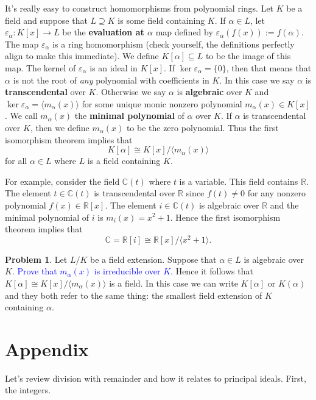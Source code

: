 \documentclass[11pt]{article}
\def\RR{\mathbb{R}}
\def\CC{\mathbb{C}}
\def\ve{\varepsilon}
\theoremstyle{definition}
\newtheorem{problem}{Problem}[section]
\numberwithin{equation}{subsection}
\newcommand{\blue}[1]{\textcolor{blue}{#1}}
\begin{document}
It's really easy to construct homomorphisms from polynomial rings.
Let $K$ be a field and suppose that $L \supseteq K$ is some field containing $K$.
If $\alpha \in L$, let $\ve_\alpha : K[x] \to L$ be the \textbf{evaluation at $\alpha$} map defined by $\ve_\alpha(f(x)) := f(\alpha)$.
The map $\ve_\alpha$ is a ring homomorphism (check yourself, the definitions perfectly align to make this immediate).
We define $K[\alpha] \subseteq L$ to be the image of this map.
The kernel of $\ve_\alpha$ is an ideal in $K[x]$.
If $\ker \ve_\alpha = \{0\}$, then that means that $\alpha$ is not the root of \emph{any} polynomial with coefficients in $K$.
In this case we say $\alpha$ is \textbf{transcendental} over $K$.
Otherwise we say $\alpha$ is \textbf{algebraic} over $K$ and $\ker \ve_\alpha = \langle m_\alpha(x)\rangle$ for some unique monic nonzero polynomial $m_\alpha(x) \in K[x]$.
We call $m_\alpha(x)$ the \textbf{minimal polynomial} of $\alpha$ over $K$.
If $\alpha$ is transcendental over $K$, then we define $m_\alpha(x)$ to be the zero polynomial.
Thus the first isomorphism theorem implies that
\[
    K[\alpha] \cong K[x]/\langle m_\alpha(x)\rangle
\]
for all $\alpha \in L$ where $L$ is a field containing $K$.

For example, consider the field $\CC(t)$ where $t$ is a variable.
This field contains $\RR$.
The element $t \in \CC(t)$ is transcendental over $\RR$ since $f(t) \neq 0$ for any nonzero polynomial $f(x) \in \RR[x]$.
The element $i \in \CC(t)$ is algebraic over $\RR$ and the minimal polynomial of $i$ is $m_i(x) = x^2 + 1$.
Hence the first isomorphism theorem implies that
\[
    \CC = \RR[i] \cong \RR[x]/\langle x^2 + 1\rangle.
\]

\begin{problem}
    Let $L/K$ be a field extension.
    Suppose that $\alpha \in L$ is algebraic over $K$.
    \blue{Prove that $m_\alpha(x)$ is irreducible over $K$.}
    Hence it follows that $K[\alpha] \cong K[x]/\langle m_\alpha(x)\rangle$ is a field.
    In this case we can write $K[\alpha]$ or $K(\alpha)$ and they both refer to the same thing: the smallest field extension of $K$ containing $\alpha$.
\end{problem}

\section*{Appendix}

Let's review division with remainder and how it relates to principal ideals.
First, the integers.
\end{document}
